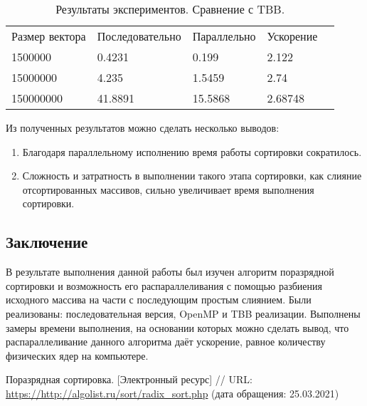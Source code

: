 \documentclass{report}
\begin{document}
\begin{table}[!h]
\caption{Результаты экспериментов. Сравнение с TBB.}
\centering
\begin{tabular}{lllll}
Размер вектора & Последовательно & Параллельно & Ускорение  \\
1500000        & 	0.4231         & 0.199     & 	2.122       \\
15000000        & 4.235         & 1.5459     & 2.74       \\
150000000       & 41.8891         & 15.5868     & 2.68748       
\end{tabular}
\end{table}
\par Из полученных результатов можно сделать несколько выводов:
\begin{enumerate} 
\item Благодаря параллельному исполнению время работы сортировки сократилось.
\item Сложность и затратность в выполнении такого этапа сортировки, как слияние отсортированных массивов, сильно увеличивает время выполнения сортировки.

\end{enumerate} 

\newpage

\begin{center}\section*{Заключение}\end{center}

В результате выполнения данной работы был изучен алгоритм поразрядной сортировки и возможность его распараллеливания с помощью разбиения исходного массива на части с последующим простым слиянием. Были реализованы: последовательная версия, OpenMP и TBB реализации. Выполнены замеры времени выполнения, на основании которых можно сделать вывод, что распараллеливание данного алгоритма даёт ускорение, равное количеству физических ядер на компьютере.
\newpage

\begin{thebibliography}{1}
 Поразрядная сортировка. [Электронный ресурс] // URL: \url {https://http://algolist.ru/sort/radix_sort.php} (дата обращения: 25.03.2021)
\end{thebibliography}
\newpage
\end{document}
